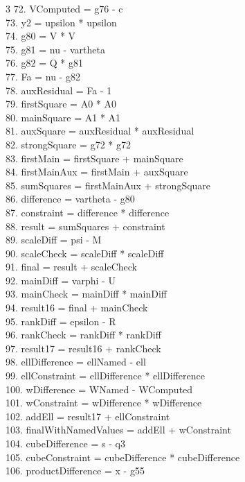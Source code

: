 \documentclass[10pt]{article}
\begin{document}
\begin{multicols}{3}
72. VComputed = g76 - c\\
73. y2 = upsilon * upsilon\\
74. g80 = V * V\\
75. g81 = nu - vartheta\\
76. g82 = Q * g81\\
77. Fa = nu - g82\\
78. auxResidual = Fa - 1\\
79. firstSquare = A0 * A0\\
80. mainSquare = A1 * A1\\
81. auxSquare = auxResidual * auxResidual\\
82. strongSquare = g72 * g72\\
83. firstMain = firstSquare + mainSquare\\
84. firstMainAux = firstMain + auxSquare\\
85. sumSquares = firstMainAux + strongSquare\\
86. difference = vartheta - g80\\
87. constraint = difference * difference\\
88. result = sumSquares + constraint\\
89. scaleDiff = psi - M\\
90. scaleCheck = scaleDiff * scaleDiff\\
91. final = result + scaleCheck\\
92. mainDiff = varphi - U\\
93. mainCheck = mainDiff * mainDiff\\
94. result16 = final + mainCheck\\
95. rankDiff = epsilon - R\\
96. rankCheck = rankDiff * rankDiff\\
97. result17 = result16 + rankCheck\\
98. ellDifference = ellNamed - ell\\
99. ellConstraint = ellDifference * ellDifference\\
100. wDifference = WNamed - WComputed\\
101. wConstraint = wDifference * wDifference\\
102. addEll = result17 + ellConstraint\\
103. finalWithNamedValues = addEll + wConstraint\\
104. cubeDifference = s - q3\\
105. cubeConstraint = cubeDifference * cubeDifference\\
106. productDifference = x - g55\\

\end{multicols}
\end{document}
